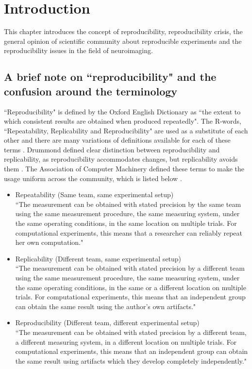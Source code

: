 \chapter{Introduction}
This chapter introduces the concept of reproducibility, reproducibility crisis, the general opinion of scientific community about reproducible experiments and the reproducibility issues in the field of neuroimaging. 

\section{A brief note on ``reproducibility" and the confusion around the terminology}

``Reproducibility" is defined by the Oxford English Dictionary as ``the extent to which consistent results are obtained when produced repeatedly". The R-words, ``Repeatability, Replicability and Reproducibility" are used as a substitute of each other and there are many variations of definitions available for each of these terms \cite{Plesser2018}. Drummond defined clear distinction between reproducibility and replicability, as reproducibility accommodates changes, but replicability avoids them \cite{Drummond}. The Association of Computer Machinery defined these terms to make the usage uniform across the community, which is listed below \cite{ACM2016}.

\begin{itemize}
\item {Repeatability (Same team, same experimental setup)\\}
      ``The measurement can be obtained with stated precision by the same team using the same measurement procedure, the same measuring system, under the same operating conditions, in the same location on multiple trials. For computational experiments, this means that a researcher can reliably repeat her own computation."
\item{Replicability (Different team, same experimental setup)\\}
      ``The measurement can be obtained with stated precision by a different team using the same measurement procedure, the same measuring system, under the same operating conditions, in the same or a different location on multiple trials. For computational experiments, this means that an independent group can obtain the same result using the author's own artifacts."
\item{Reproducibility (Different team, different experimental setup)\\}
      ``The measurement can be obtained with stated precision by a different team, a different measuring system, in a different location on multiple trials. For computational experiments, this means that an independent group can obtain the same result using artifacts which they develop completely independently."
\end{itemize}

